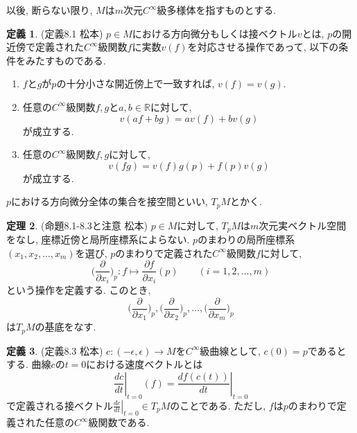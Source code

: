 \documentclass[uplatex]{suribt}
\theoremstyle{definition}
\newtheorem{theorem}{定理}[chapter]
\newtheorem{definition}[theorem]{定義}
\begin{document}
以後, 断らない限り, \(M\)は\(m\)次元\(C^\infty\)級多様体を指すものとする.

\begin{definition}
(定義8.1 松本) \(p \in M\)における方向微分もしくは接ベクトル\(v\)とは, \(p\)の開近傍で定義された\(C^\infty\)級関数\(f\)に実数\(v(f)\)を対応させる操作であって, 以下の条件をみたすものである.
\begin{enumerate}
    \item \(f\)と\(g\)が\(p\)の十分小さな開近傍上で一致すれば, \(v(f)=v(g)\).
    \item 任意の\(C^\infty\)級関数\(f,g\)と\(a,b \in \mathbb{R}\)に対して,
        \begin{equation*}
            v(af+bg) = av(f)+bv(g)
        \end{equation*}
    が成立する.
    \item 任意の\(C^\infty\)級関数\(f,g\)に対して,
        \begin{equation*}
            v(fg) = v(f)g(p) + f(p)v(g)
        \end{equation*}
    が成立する.
\end{enumerate}
\(p\)における方向微分全体の集合を接空間といい, \(T_pM\)とかく.
\end{definition}

\begin{theorem}
(命題8.1-8.3と注意 松本) \(p \in M\)に対して, \(T_pM\)は\(m\)次元実ベクトル空間をなし, 座標近傍と局所座標系によらない. \(p\)のまわりの局所座標系\((x_1,x_2,\ldots,x_m)\)を選び, \(p\)のまわりで定義された\(C^\infty\)級関数\(f\)に対して,
\begin{equation*}
    \bigg(\frac{\partial}{\partial x_i}\bigg)_p:f \mapsto \frac{\partial f}{\partial x_i}(p) \qquad (i=1,2,\ldots,m)
\end{equation*}
という操作を定義する. このとき,
\begin{equation*}
    \bigg(\frac{\partial}{\partial x_1}\bigg)_p, \bigg(\frac{\partial}{\partial x_2}\bigg)_p,\ldots,\bigg(\frac{\partial}{\partial x_m}\bigg)_p
\end{equation*}
は\(T_pM\)の基底をなす.
\end{theorem}

\begin{definition}
(定義8.3 松本) \(c:(-\epsilon,\epsilon) \to M\)を\(C^\infty\)級曲線として, \(c(0)=p\)であるとする. 曲線\(c\)の\(t=0\)における速度ベクトルとは
\begin{equation*}
    \left.\frac{dc}{dt}\right|_{t=0}(f) = \left.\frac{df(c(t))}{dt}\right|_{t=0}
\end{equation*}
で定義される接ベクトル\(\left.\frac{dc}{dt}\right|_{t=0} \in T_pM\)のことである. ただし, \(f\)は\(p\)のまわりで定義された任意の\(C^\infty\)級関数である.
\end{definition}
\end{document}
